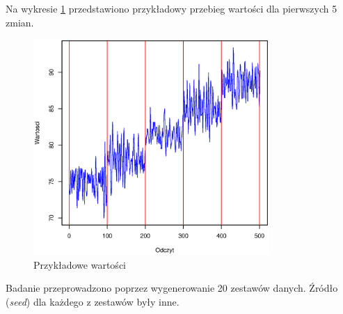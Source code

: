 Na wykresie \ref{fig:JumpingValues} przedstawiono przykładowy przebieg wartości dla pierwszych 5 zmian.
\begin{figure}[htbp]
  \centering
  \includegraphics[width=0.8\textwidth]{img/ch-5-jumping}
  \caption{Przykładowe wartości}
  \label{fig:JumpingValues}
\end{figure}
Badanie przeprowadzono poprzez wygenerowanie 20 zestawów danych.
Źródło (\textit{seed}) dla każdego z zestawów były inne.

